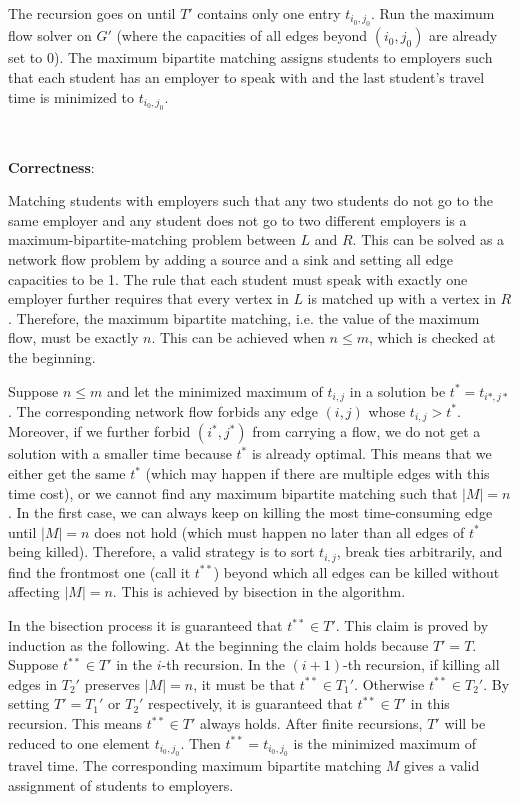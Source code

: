 \documentclass{article}
\begin{document}
The recursion goes on until $T'$ contains only one entry $t_{i_0,j_0}$. Run the maximum flow solver on $G'$ (where the capacities of all edges beyond $(i_0,j_0)$ are already set to 0). The maximum bipartite matching assigns students to employers such that each student has an employer to speak with and the last student's travel time is minimized to $t_{i_0,j_0}$.

~

\noindent\textbf{Correctness}:

Matching students with employers such that any two students do not go to the same employer and any student does not go to two different employers is a maximum-bipartite-matching problem between $L$ and $R$. This can be solved as a network flow problem by adding a source and a sink and setting all edge capacities to be 1. The rule that each student must speak with exactly one employer further requires that every vertex in $L$ is matched up with a vertex in $R$. Therefore, the maximum bipartite matching, i.e. the value of the maximum flow, must be exactly $n$. This can be achieved when $n\leqslant m$, which is checked at the beginning.

Suppose $n\leqslant m$ and let the minimized maximum of $t_{i,j}$ in a solution be $t^*=t_{i*,j*}$. The corresponding network flow forbids any edge $(i,j)$ whose $t_{i,j}>t^*$. Moreover, if we further forbid $(i^*,j^*)$ from carrying a flow, we do not get a solution with a smaller time because $t^*$ is already optimal. This means that we either get the same $t^*$ (which may happen if there are multiple edges with this time cost), or we cannot find any maximum bipartite matching such that $|M|=n$. In the first case, we can always keep on killing the most time-consuming edge until $|M|=n$ does not hold (which must happen no later than all edges of $t^*$ being killed). Therefore, a valid strategy is to sort $t_{i,j}$, break ties arbitrarily, and find the frontmost one (call it $t^{**}$) beyond which all edges can be killed without affecting $|M|=n$. This is achieved by bisection in the algorithm.

In the bisection process it is guaranteed that $t^{**}\in T'$. This claim is proved by induction as the following. At the beginning the claim holds because $T'=T$. Suppose $t^{**}\in T'$ in the $i$-th recursion. In the $(i+1)$-th recursion, if killing all edges in $T_2'$ preserves $|M|=n$, it must be that $t^{**}\in T_1'$. Otherwise $t^{**}\in T_2'$. By setting $T'=T_1'$ or $T_2'$ respectively, it is guaranteed that $t^{**}\in T'$ in this recursion. This means $t^{**}\in T'$ always holds. After finite recursions, $T'$ will be reduced to one element $t_{i_0,j_0}$. Then $t^{**}=t_{i_0,j_0}$ is the minimized maximum of travel time. The corresponding maximum bipartite matching $M$ gives a valid assignment of students to employers.
\end{document}
